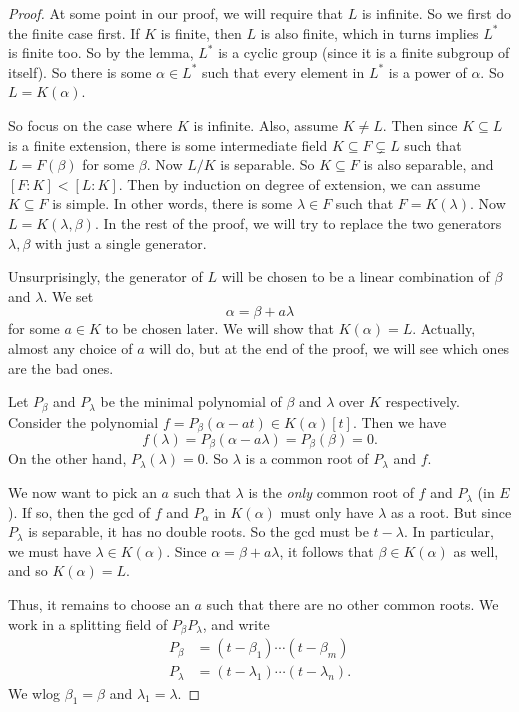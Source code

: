 \documentclass[a4paper]{article}
\begin{document}
\begin{proof}
  At some point in our proof, we will require that $L$ is infinite. So we first do the finite case first. If $K$ is finite, then $L$ is also finite, which in turns implies $L^*$ is finite too. So by the lemma, $L^*$ is a cyclic group (since it is a finite subgroup of itself). So there is some $\alpha \in L^*$ such that every element in $L^*$ is a power of $\alpha$. So $L = K(\alpha)$.

  So focus on the case where $K$ is infinite. Also, assume $K \not= L$. Then since $K \subseteq L$ is a finite extension, there is some intermediate field $K\subseteq F\subsetneq L$ such that $L = F(\beta)$ for some $\beta$. Now $L/K$ is separable. So $K\subseteq F$ is also separable, and $[F:K] < [L:K]$. Then by induction on degree of extension, we can assume $K\subseteq F$ is simple. In other words, there is some $\lambda \in F$ such that $F = K(\lambda)$. Now $L = K(\lambda, \beta)$. In the rest of the proof, we will try to replace the two generators $\lambda, \beta$ with just a single generator.

  Unsurprisingly, the generator of $L$ will be chosen to be a linear combination of $\beta$ and $\lambda$. We set
  \[
    \alpha = \beta + a \lambda
  \]
  for some $a \in K$ to be chosen later. We will show that $K(\alpha) = L$. Actually, almost any choice of $a$ will do, but at the end of the proof, we will see which ones are the bad ones.

  Let $P_\beta$ and $P_\lambda$ be the minimal polynomial of $\beta$ and $\lambda$ over $K$ respectively. Consider the polynomial $f = P_\beta(\alpha - at) \in K(\alpha)[t]$. Then we have
  \[
    f(\lambda) = P_\beta(\alpha - a\lambda) = P_\beta(\beta) = 0.
  \]
  On the other hand, $P_\lambda(\lambda) = 0$. So $\lambda$ is a common root of $P_\lambda$ and $f$.

  We now want to pick an $a$ such that $\lambda$ is the \emph{only} common root of $f$ and $P_\lambda$ (in $E$). If so, then the gcd of $f$ and $P_\alpha$ in $K(\alpha)$ must only have $\lambda$ as a root. But since $P_\lambda$ is separable, it has no double roots. So the gcd must be $t - \lambda$. In particular, we must have $\lambda \in K(\alpha)$. Since $\alpha = \beta + a \lambda$, it follows that $\beta \in K(\alpha)$ as well, and so $K(\alpha )= L$.

  Thus, it remains to choose an $a$ such that there are no other common roots. We work in a splitting field of $P_\beta P_\lambda$, and write
  \begin{align*}
    P_\beta &= (t - \beta_1)\cdots (t - \beta_m)\\
    P_\lambda &= (t - \lambda_1) \cdots (t - \lambda_n).
  \end{align*}
  We wlog $\beta_1 = \beta$ and $\lambda_1 = \lambda$.


\end{proof}
\end{document}
